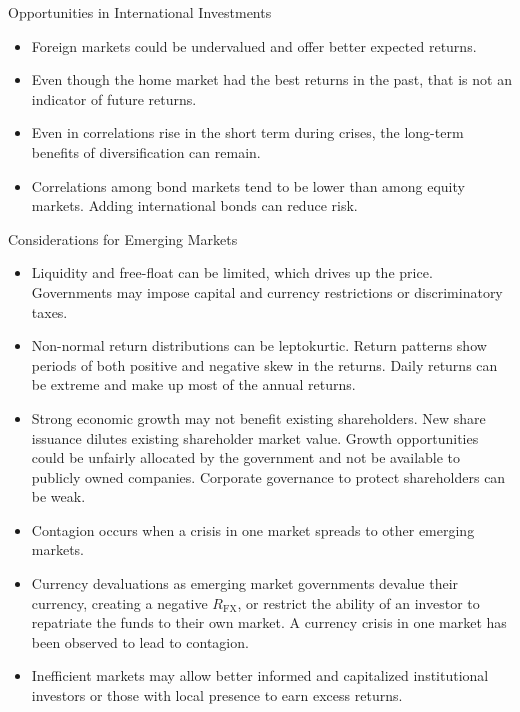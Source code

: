 \documentclass[../custom]{flashcards}
\newcommand{\studyArea}{Asset Allocation}
\begin{document}
\begin{flashcard}[\studyArea]{Opportunities in International Investments}
    \begin{itemize}
        \item Foreign markets could be undervalued and offer better expected returns.
        \item Even though the home market had the best returns in the past, that is not an indicator of future returns.
        \item Even in correlations rise in the short term during crises, the long-term benefits of diversification can remain.
        \item Correlations among bond markets tend to be lower than among equity markets. Adding international bonds can reduce risk.
    \end{itemize}
\end{flashcard}

\begin{flashcard}[\studyArea]{Considerations for Emerging Markets}
    \begin{itemize}
        \item Liquidity and free-float can be limited, which drives up the price. Governments may impose capital and currency restrictions or discriminatory taxes.
        \item Non-normal return distributions can be leptokurtic. Return patterns show periods of both positive and negative skew in the returns. Daily returns can be extreme and make up most of the annual returns.
        \item Strong economic growth may not benefit existing shareholders. New share issuance dilutes existing shareholder market value. Growth opportunities could be unfairly allocated by the government and not be available to publicly owned companies. Corporate governance to protect shareholders can be weak.
        \item Contagion occurs when a crisis in one market spreads to other emerging markets.
        \item Currency devaluations as emerging market governments devalue their currency, creating a negative $R_{\text{FX}}$, or restrict the ability of an investor to repatriate the funds to their own market. A currency crisis in one market has been observed to lead to contagion.
        \item Inefficient markets may allow better informed and capitalized institutional investors or those with local presence to earn excess returns.
    \end{itemize}
\end{flashcard}
\end{document}

